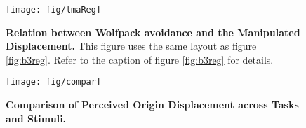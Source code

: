 \documentclass[10pt]{article}
\begin{document}
\begin{figure}[!ht]
\begin{center}
\texttt{[image: fig/lmaReg]}
\end{center}
\caption{
{\bf Relation between Wolfpack avoidance and the Manipulated Displacement.}
This figure uses the same layout as figure \ref{fig:b3reg}. Refer to the caption of figure \ref{fig:b3reg} for details.
}\label{fig:lmaReg}
\end{figure}

\begin{figure}[!ht]
\begin{center}
\texttt{[image: fig/compar]}
\end{center}
\caption{
{\bf Comparison of Perceived Origin Displacement across Tasks and Stimuli.}
}\label{fig:lmaReg}
\end{figure}
\end{document}
